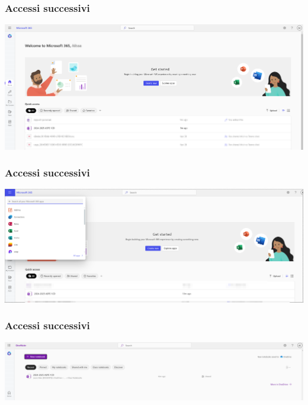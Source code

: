 \documentclass{beamer}
\begin{document}
\begin{frame}
  \frametitle{Accessi successivi}
  \begin{center}
    \includegraphics[width=0.8\linewidth]{images/8.png}
  \end{center}
\end{frame}

\begin{frame}
  \frametitle{Accessi successivi}
  \begin{center}
    \includegraphics[width=0.8\linewidth]{images/9.png}
  \end{center}
\end{frame}

\begin{frame}
  \frametitle{Accessi successivi}
  \begin{center}
    \includegraphics[width=0.8\linewidth]{images/10.png}
  \end{center}
\end{frame}



\end{document}
